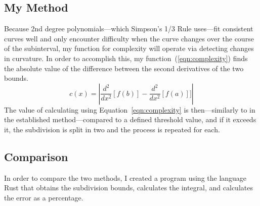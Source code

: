 \documentclass{paper}
\newcommand{\sder}[1]{\dfrac{d^2}{dx^2}\left[#1\right]}
\begin{document}
\subsection{My Method}
Because 2nd degree polynomials---which Simpson's 1/3 Rule uses---fit consistent curves well and only encounter difficulty when the curve changes over the course of the subinterval, my function for complexity will operate via detecting changes in curvature.
In order to accomplish this, my function~(\ref{eqn:complexity}) finds the absolute value of the difference between the second derivatives of the two bounds.
% 
\begin{equation}
    \label{eqn:complexity}
    c(x) = \left|\sder{f(b)} - \sder{f(a)}]\right|
\end{equation}
% 
The value of calculating using Equation~\ref{eqn:complexity} is then---similarly to in the established method---compared to a defined threshold value, and if it exceeds it, the subdivision is split in two and the process is repeated for each.

\subsection{Comparison}
In order to compare the two methods, I created a program using the language Rust that obtains the subdivision bounds, calculates the integral, and calculates the error as a percentage.
%




%
\end{document}
